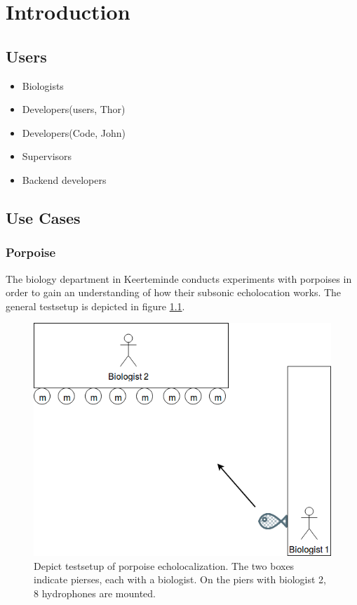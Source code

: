 \chapter{Introduction}


\section{Users}

\begin{itemize}
	\item Biologists
	\item Developers(users, Thor)
	\item Developers(Code, John)
	\item Supervisors
	\item Backend developers
\end{itemize}

\section{Use Cases}
\newpage
\subsection{Porpoise}
The biology department in Keerteminde conducts experiments with porpoises in order to gain an understanding of how their subsonic echolocation works. The general testsetup is depicted in figure \ref{usecase:porpoise_experiment1}.
\begin{figure}[!h]
    \centering
	\includegraphics[width=\textwidth]{figures/porpoise_experiment1}
	\caption{Depict testsetup of porpoise echolocalization. The two boxes indicate pierses, each with a biologist. On the piers with biologist 2, 8 hydrophones are mounted.}\label{usecase:porpoise_experiment1}
\end{figure}


